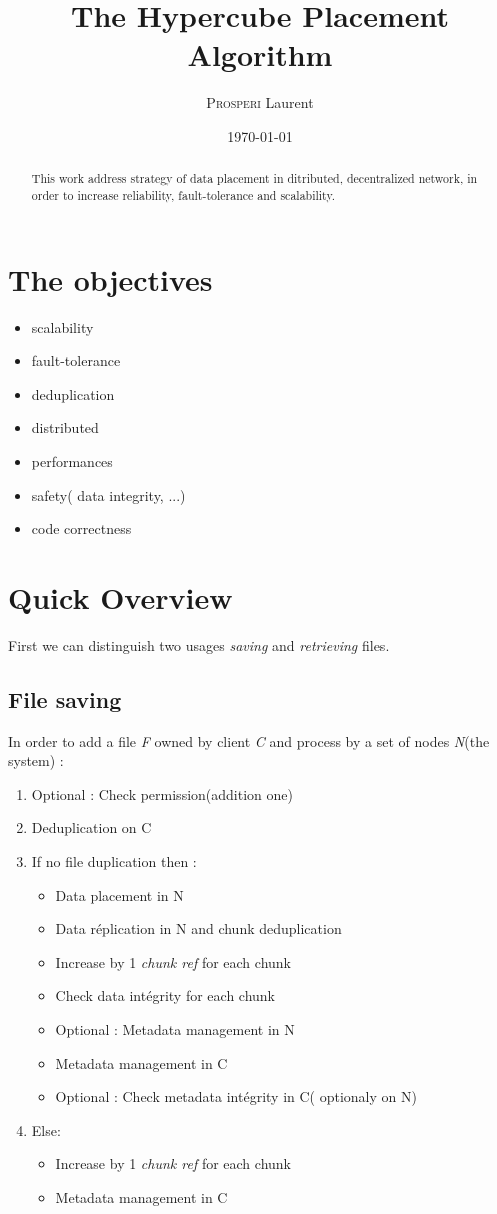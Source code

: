 \documentclass[a4paper,10pt]{article}
\title{The Hypercube Placement Algorithm}
\author{\textsc{Prosperi} Laurent}
\date\today %
\begin{document}
\maketitle


\begin{abstract}
   This work address strategy of data placement in ditributed, decentralized network, in order to increase reliability, 
   fault-tolerance and scalability.
   
\end{abstract}

\section{The objectives}
\begin{itemize}
 \item scalability
 \item fault-tolerance
 \item deduplication
 \item distributed
 \item performances
 \item safety( data integrity, ...)
 \item code correctness
\end{itemize}


\section{Quick Overview}
First we can distinguish two usages \textit{saving} and \textit{retrieving} files.

\subsection{File saving}
In order to add a file \textit{F} owned by client \textit{C} and process by a set of nodes \textit{N}(the system) :
\begin{enumerate}
 \item Optional : Check permission(addition one)
 \item Deduplication on C
 \item If no file duplication then :
 \begin{itemize}
  \item Data placement in N
  \item Data réplication in N and chunk deduplication
  \item Increase by 1 \textit{chunk ref} for each chunk
  \item Check data intégrity for each chunk
  \item Optional : Metadata management in N
  \item Metadata management in C
  \item Optional : Check metadata intégrity in C( optionaly on N)
 \end{itemize}
 \item Else:
 \begin{itemize}
  \item Increase by 1 \textit{chunk ref} for each chunk
  \item Metadata management in C
 \end{itemize}
\end{enumerate}
\end{document}
